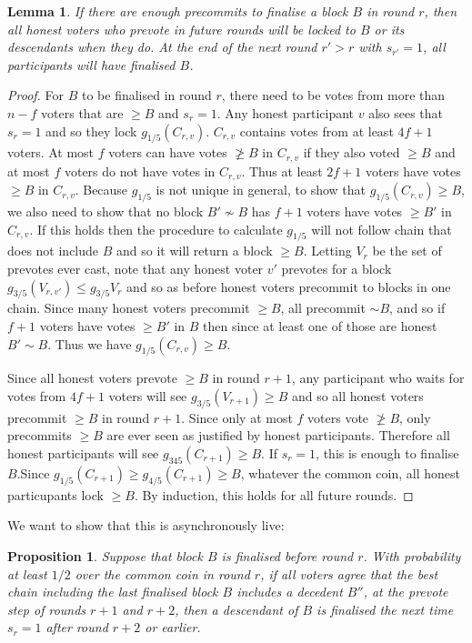 \documentclass{article}
\newtheorem{lemma}[theorem]{Lemma}
\newtheorem{proposition}[theorem]{Proposition}
\begin{document}
\begin{lemma} \label{lem:possibly-final-implies-permanent-lock}
If there are enough precommits to finalise a block $B$ in round $r$, then all honest voters who prevote in future rounds will be locked to $B$ or its descendants when they do. At the end of the next round $r' > r$ with $s_{r'}=1$, all participants will have finalised $B$.
\end{lemma}
\begin{proof}
For $B$ to be finalised in round $r$, there need to be votes from more than $n-f$ voters that are $\geq B$ and $s_r=1$. Any honest participant $v$ also sees that $s_r=1$ and so they lock $g_{1/5}(C_{r,v})$. $C_{r,v}$ contains votes from at least $4f+1$ voters. At most $f$  voters can have votes  $\not\geq B$ in $C_{r,v}$ if they also voted $\geq B$ and at most $f$ voters do not have votes in $C_{r,v}$.
 Thus at least $2f+1$ voters have votes $\geq B$ in $C_{r,v}$. Because $g_{1/5}$ is not unique in general, to show that $g_{1/5}(C_{r,v}) \geq B$, we also need to show that no block $B' \nsim B$ has $f+1$ voters have votes $\geq B'$ in $C_{r,v}$. If this holds then the procedure to calculate $g_{1/5}$ will not follow chain that does not include $B$ and so it will return a block $\geq B$.
 Letting $V_r$ be the set of prevotes ever cast, note that any honest voter $v'$ prevotes for a block $g_{3/5}(V_{r,v'}) \leq g_{3/5}{V_r}$ and so as before honest voters precommit to blocks in one chain.
 Since many honest voters precommit $\geq B$, all precommit $\sim B$, and so if $f+1$ voters have votes $\geq B'$ in $B$ then since at least one of those are honest $B' \sim B$. Thus we have $g_{1/5}(C_{r,v}) \geq B$.

Since all honest voters prevote $\geq B$ in round $r+1$, any participant who waits for votes from $4f+1$ voters will see $g_{3/5}(V_{r+1}) \geq B$ and so all honest voters precommit $\geq B$ in round $r+1$. Since only at most $f$ voters vote $\not \geq B$, only precommits $\geq B$ are ever seen as justified by honest participants. Therefore all honest participants will see $g_{345}(C_{r+1}) \geq 
B$.
If $s_r=1$, this is enough to finalise $B$.Since $g_{1/5}(C_{r+1}) \geq g_{4/5}(C_{r+1}) \geq 
B$, whatever the common coin, all honest particupants lock $\geq B$. By induction, this holds for all future rounds.

\end{proof}

We want to show that this is asynchronously live:

\begin{proposition} Suppose that block $B$ is finalised before round $r$. With probability at least $1/2$ over the common coin in round $r$, if all voters agree that the best chain including the last finalised block $B$ includes a decedent $B''$, at the prevote step of rounds $r+1$ and $r+2$, then a descendant of $B$ is finalised the next time $s_r=1$ after round $r+2$ or earlier.
\end{proposition}
\end{document}
